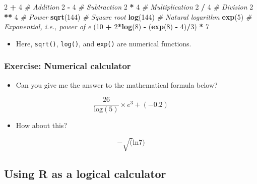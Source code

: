 \documentclass[
]{book}
\newenvironment{Shaded}{\begin{snugshade}}{\end{snugshade}}
\newcommand{\CommentTok}[1]{\textcolor[rgb]{0.56,0.35,0.01}{\textit{#1}}}
\newcommand{\DecValTok}[1]{\textcolor[rgb]{0.00,0.00,0.81}{#1}}
\newcommand{\FunctionTok}[1]{\textcolor[rgb]{0.13,0.29,0.53}{\textbf{#1}}}
\newcommand{\NormalTok}[1]{#1}
\newcommand{\SpecialCharTok}[1]{\textcolor[rgb]{0.81,0.36,0.00}{\textbf{#1}}}
\providecommand{\tightlist}{%
  \setlength{\itemsep}{0pt}\setlength{\parskip}{0pt}}
\begin{document}
\begin{Shaded}
\begin{Highlighting}[]
\DecValTok{2} \SpecialCharTok{+} \DecValTok{4} \CommentTok{\# Addition}
\DecValTok{2} \SpecialCharTok{{-}} \DecValTok{4} \CommentTok{\# Subtraction}
\DecValTok{2} \SpecialCharTok{*} \DecValTok{4} \CommentTok{\# Multiplication}
\DecValTok{2} \SpecialCharTok{/} \DecValTok{4} \CommentTok{\# Division}
\DecValTok{2} \SpecialCharTok{**} \DecValTok{4} \CommentTok{\# Power}
\FunctionTok{sqrt}\NormalTok{(}\DecValTok{144}\NormalTok{) }\CommentTok{\# Square root}
\FunctionTok{log}\NormalTok{(}\DecValTok{144}\NormalTok{) }\CommentTok{\# Natural logarithm}
\FunctionTok{exp}\NormalTok{(}\DecValTok{5}\NormalTok{) }\CommentTok{\# Exponential, i.e., power of e}
\NormalTok{(}\DecValTok{10} \SpecialCharTok{+} \DecValTok{2}\SpecialCharTok{*}\FunctionTok{log}\NormalTok{(}\DecValTok{8}\NormalTok{) }\SpecialCharTok{{-}}\NormalTok{ (}\FunctionTok{exp}\NormalTok{(}\DecValTok{8}\NormalTok{) }\SpecialCharTok{{-}} \DecValTok{4}\NormalTok{)}\SpecialCharTok{/}\DecValTok{3}\NormalTok{) }\SpecialCharTok{*} \DecValTok{7}
\end{Highlighting}
\end{Shaded}

\begin{itemize}
\tightlist
\item
  Here, \texttt{sqrt()}, \texttt{log()}, and \texttt{exp()} are numerical functions.
\end{itemize}

\subsubsection{Exercise: Numerical calculator}\label{exercise-numerical-calculator}

\begin{itemize}
\tightlist
\item
  Can you give me the answer to the mathematical formula below?
\end{itemize}

\[
\frac{26}{\text{log}(5)}\times e^{3} + (-0.2)
\]

\begin{itemize}
\tightlist
\item
  How about this?
\end{itemize}

\[
-\sqrt( \text{ln}7 )
\]

\subsection{Using R as a logical calculator}\label{using-r-as-a-logical-calculator}
\end{document}
